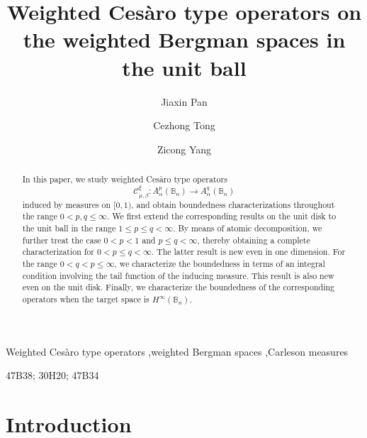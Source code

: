\documentclass[preprint,12pt,times]{elsarticle}
\theoremstyle{definition}
\theoremstyle{remark}
\numberwithin{equation}{section}
\begin{document}
\begin{frontmatter}


\title{Weighted Ces\`aro type operators on the weighted Bergman spaces in the unit ball} %


\author{Jiaxin Pan}

\author{Cezhong Tong}



\author{Zicong Yang} 





    \begin{abstract}
In this paper, we study weighted Ces\`aro type operators
\[
\mathcal C_{\mu,\beta}^{\xi}:A_{\alpha}^{p}(\mathbb B_n)
\longrightarrow A_{\alpha}^{q}(\mathbb B_n)
\]
induced by measures on $[0,1)$, and obtain boundedness characterizations throughout the range
$0<p,q\le\infty$. We first extend the corresponding results on the unit disk to the unit ball in the range
$1\le p\le q<\infty$. By means of atomic decomposition, we further treat the case
$0<p<1$ and $p\le q<\infty$, thereby obtaining a complete characterization for
$0<p\le q<\infty$. The latter result is new even in one dimension. For the range $0<q<p\le\infty$, we characterize the boundedness in terms of an integral
condition involving the tail function of the inducing measure. This result is also new
even on the unit disk. Finally, we characterize the boundedness of the corresponding operators when the target
space is $H^\infty(\mathbb B_n)$.
\end{abstract}


\begin{keyword}

Weighted Ces\`aro type operators \sep weighted Bergman spaces \sep Carleson measures

\MSC[2020] 47B38; 30H20; 47B34


\end{keyword}

\end{frontmatter}


\section{Introduction}
\end{document}

